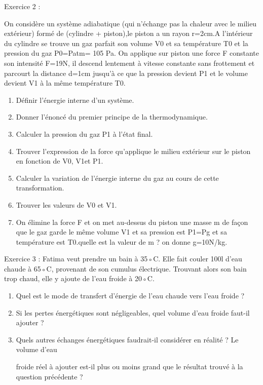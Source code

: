 \documentclass[12pt, french]{article}
\begin{document}
\begin{Box2}{Exercice 2 : }

On considère un système adiabatique (qui n’échange pas la chaleur avec le milieu extérieur) formé de  (cylindre
+ piston),le piston a un rayon r=2cm.A l’intérieur du cylindre se trouve un gaz parfait son volume V0 et sa
température T0 et la pression du gaz P0=Patm= 105
Pa.
On applique sur piston une force F constante son intensité F=19N, il descend lentement à vitesse constante sans
frottement et parcourt la distance d=1cm jusqu'à ce que la pression devient P1 et le volume devient V1 à la même
température T0.
  \begin{enumerate}
    \item Définir l’énergie interne d’un système.

\item Donner l'énoncé du premier principe de la thermodynamique.

  \item Calculer la pression du gaz P1 à l’état final.

  \item Trouver l’expression de la force qu’applique le milieu extérieur sur le piston en fonction de V0, V1et P1.

  \item Calculer la variation de l’énergie interne du gaz au cours de cette transformation.

  \item Trouver les valeurs de V0 et V1.

  \item On élimine la force F et on met au-dessus du piston une masse m de façon que le gaz garde le même
volume V1 et sa pression est P1=Pg et sa température est T0.quelle est la valeur de m ? on donne
g=10N/kg.
  \end{enumerate}
\end{Box2}

\begin{Box2}{Exercice 3 :}
Fatima veut prendre un bain à 35◦C. Elle fait couler 100l d’eau chaude à 65◦C, provenant de
son cumulus électrique. Trouvant alors son bain trop chaud, elle y ajoute de l’eau froide à 20◦C.
  \begin{enumerate}
      \item Quel est le mode de transfert d’énergie de l’eau chaude vers l’eau froide ?
      \item Si les pertes énergétiques sont négligeables, quel volume d’eau froide faut-il ajouter ?
\item  Quels autres échanges énergétiques faudrait-il considérer en réalité ? Le volume d’eau

froide réel à ajouter est-il plus ou moins grand que le résultat trouvé à la question précédente ?
  \end{enumerate}
\end{Box2}
\end{document}
